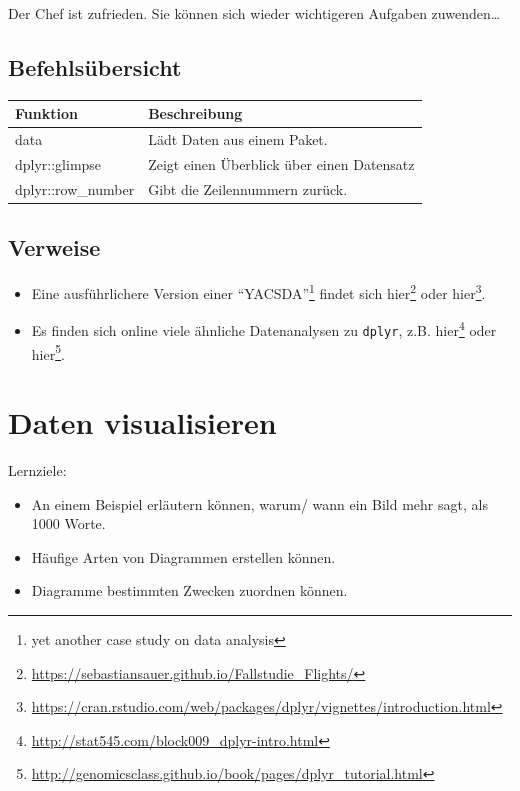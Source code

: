 \documentclass[12pt,ngerman,]{book}
\providecommand{\tightlist}{%
  \setlength{\itemsep}{0pt}\setlength{\parskip}{0pt}}
\let\rmarkdownfootnote\footnote%
\def\footnote{\protect\rmarkdownfootnote}
\let\BeginKnitrBlock\begin \let\EndKnitrBlock\end
\begin{document}
Der Chef ist zufrieden. Sie können sich wieder wichtigeren Aufgaben
zuwenden\ldots{}

\section{Befehlsübersicht}\label{befehlsubersicht-4}

\begin{longtable}[]{@{}ll@{}}
\toprule
Funktion & Beschreibung\tabularnewline
\midrule
\endhead
data & Lädt Daten aus einem Paket.\tabularnewline
dplyr::glimpse & Zeigt einen Überblick über einen
Datensatz\tabularnewline
dplyr::row\_number & Gibt die Zeilennummern zurück.\tabularnewline
\bottomrule
\end{longtable}

\section{Verweise}\label{verweise-3}

\begin{itemize}
\item
  Eine ausführlichere Version einer ``YACSDA''\footnote{yet another case
    study on data analysis} findet sich hier\footnote{\url{https://sebastiansauer.github.io/Fallstudie_Flights/}}
  oder hier\footnote{\url{https://cran.rstudio.com/web/packages/dplyr/vignettes/introduction.html}}.
\item
  Es finden sich online viele ähnliche Datenanalysen zu \texttt{dplyr},
  z.B. hier\footnote{\url{http://stat545.com/block009_dplyr-intro.html}}
  oder hier\footnote{\url{http://genomicsclass.github.io/book/pages/dplyr_tutorial.html}}.
\end{itemize}

\chapter{Daten visualisieren}\label{daten-visualisieren}

\BeginKnitrBlock{rmdcaution}
Lernziele:

\begin{itemize}
\tightlist
\item
  An einem Beispiel erläutern können, warum/ wann ein Bild mehr sagt,
  als 1000 Worte.
\item
  Häufige Arten von Diagrammen erstellen können.
\item
  Diagramme bestimmten Zwecken zuordnen können.
\end{itemize}
\EndKnitrBlock{rmdcaution}
\end{document}

